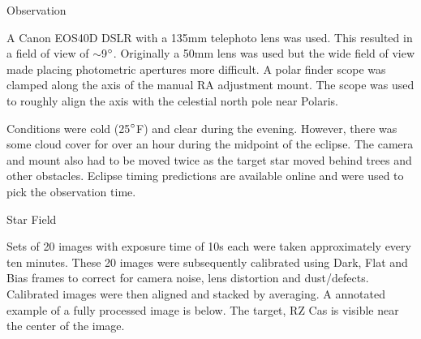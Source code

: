 \documentclass[final]{beamer}
\newlength{\colwidth}
\begin{document}
\begin{frame}[t]
\begin{columns}[t]
\begin{column}{\colwidth}
\begin{block}{Observation}
%

    A Canon EOS40D DSLR with a 135mm telephoto lens was used. This resulted
    in a field of view of $\sim$9$\degree$. Originally a 50mm lens was used but the wide
    field of view made placing photometric apertures more difficult.  A polar finder scope was clamped along the axis of the manual RA adjustment mount. The scope was used to roughly align the axis with the celestial north pole near Polaris. 

    Conditions were cold (25$\degree$F) and clear during the evening. However, there was some 
    cloud cover for over an hour during the midpoint of the eclipse. The camera and mount 
    also had to be moved twice as the target star moved behind trees and other obstacles.  
    Eclipse timing predictions are available online and were used to pick the observation 
    time.

  \end{block}

  \begin{block}{Star Field}

    Sets of 20 images with exposure time of 10s each were taken approximately every ten
    minutes. These 20 images were subsequently calibrated using Dark, Flat and Bias frames
    to correct for camera noise, lens distortion and dust/defects. Calibrated images were
    then aligned and stacked by averaging. A annotated example of a fully processed image
    is below. The target, RZ Cas is visible near the center of the image.


\end{block}
\end{column}
\end{columns}
\end{frame}
\end{document}
